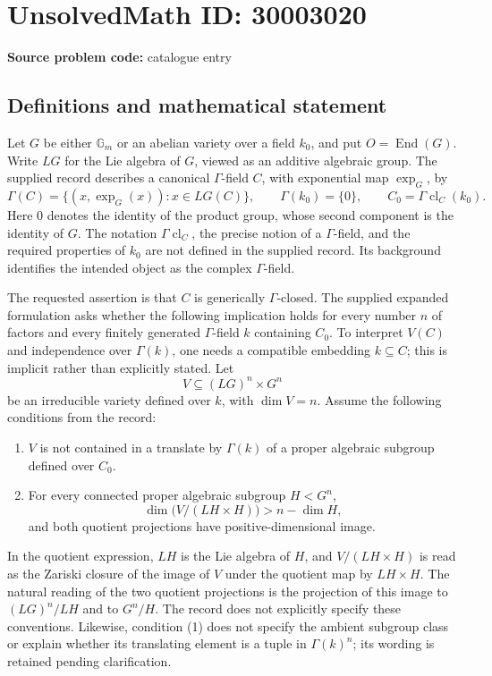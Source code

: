 \documentclass[11pt]{article}
\begin{document}
\section*{UnsolvedMath ID: 30003020}
\textbf{Source problem code:} catalogue entry
\subsection{Definitions and mathematical statement}
Let \(G\) be either \(\mathbb G_m\) or an abelian variety over a field \(k_0\), and put \(O=\operatorname{End}(G)\). Write \(LG\) for the Lie algebra of \(G\), viewed as an additive algebraic group. The supplied record describes a canonical \(\Gamma\)-field \(C\), with exponential map \(\exp_G\), by
\[
\Gamma(C)=\{(x,\exp_G(x)):x\in LG(C)\},\qquad
\Gamma(k_0)=\{0\},\qquad
C_0=\Gamma\operatorname{cl}_C(k_0).
\]
Here \(0\) denotes the identity of the product group, whose second component is the identity of \(G\). The notation \(\Gamma\operatorname{cl}_C\), the precise notion of a \(\Gamma\)-field, and the required properties of \(k_0\) are not defined in the supplied record. Its background identifies the intended object as the complex \(\Gamma\)-field.

The requested assertion is that \(C\) is generically \(\Gamma\)-closed. The supplied expanded formulation asks whether the following implication holds for every number \(n\) of factors and every finitely generated \(\Gamma\)-field \(k\) containing \(C_0\). To interpret \(V(C)\) and independence over \(\Gamma(k)\), one needs a compatible embedding \(k\subseteq C\); this is implicit rather than explicitly stated. Let
\[
V\subseteq (LG)^n\times G^n
\]
be an irreducible variety defined over \(k\), with \(\dim V=n\). Assume the following conditions from the record:
\begin{enumerate}
\item \(V\) is not contained in a translate by \(\Gamma(k)\) of a proper algebraic subgroup defined over \(C_0\).
\item For every connected proper algebraic subgroup \(H<G^n\),
\[
\dim\bigl(V/(LH\times H)\bigr)>n-\dim H,
\]
and both quotient projections have positive-dimensional image.
\end{enumerate}
In the quotient expression, \(LH\) is the Lie algebra of \(H\), and \(V/(LH\times H)\) is read as the Zariski closure of the image of \(V\) under the quotient map by \(LH\times H\). The natural reading of the two quotient projections is the projection of this image to \((LG)^n/LH\) and to \(G^n/H\). The record does not explicitly specify these conventions. Likewise, condition (1) does not specify the ambient subgroup class or explain whether its translating element is a tuple in \(\Gamma(k)^n\); its wording is retained pending clarification.
\end{document}
